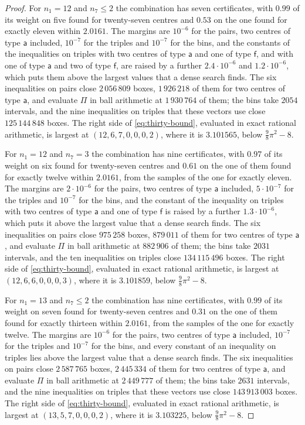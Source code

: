 \documentclass[11pt,reqno]{amsart}
\renewcommand{\_}{\origunderscore\allowbreak}
\numberwithin{equation}{section}
\theoremstyle{plain}
\theoremstyle{definition}
\theoremstyle{remark}
\begin{document}
\begin{proof}
For $n_1=12$ and $n_7\le2$ the combination has seven certificates, with
$0.99$ of its weight on five found for twenty-seven centres and $0.53$ on the
one found for exactly eleven within $2.0161$. The margins are $10^{-6}$ for
the pairs, two centres of type $\mathsf a$ included, $10^{-7}$ for the
triples and $10^{-7}$ for the bins, and the constants of the inequalities on
triples with two centres of type $\mathsf a$ and one of type $\mathsf f$,
and with one of type $\mathsf a$ and two of type $\mathsf f$, are raised
by a further $2.4\cdot10^{-6}$ and $1.2\cdot10^{-6}$, which puts them
above the largest values that a dense search finds. The six inequalities on pairs close $2\,056\,809$
boxes, $1\,926\,218$ of them for two centres of type $\mathsf a$, and evaluate $\Pi$
in ball arithmetic at $1\,930\,764$ of them; the bins take $2054$ intervals, and the
nine inequalities on triples that these vectors use close $125\,144\,848$ boxes. The
right side of \eqref{eq:thirty-bound}, evaluated in exact rational
arithmetic, is largest at $(12,6,7,0,0,0,2)$, where it is $3.101565$, below $\frac98\pi^2-8$.

For $n_1=12$ and $n_7=3$ the combination has nine certificates, with $0.97$
of its weight on six found for twenty-seven centres and $0.61$ on the one of
them found for exactly twelve within $2.0161$, from the samples of the one
for exactly eleven. The margins are $2\cdot10^{-6}$ for the pairs, two
centres of type $\mathsf a$ included, $5\cdot10^{-7}$ for the triples and
$10^{-7}$ for the bins,
and the constant of the inequality on triples with two centres of type
$\mathsf a$ and one of type $\mathsf f$ is raised by a further
$1.3\cdot10^{-6}$, which puts it above the largest value that a dense
search finds. The six inequalities on pairs close $975\,258$ boxes,
$879\,011$ of them for two centres of type $\mathsf a$, and evaluate $\Pi$ in
ball arithmetic at $882\,906$ of them; the bins take $2031$ intervals, and the ten
inequalities on triples close $134\,115\,496$ boxes. The right side of
\eqref{eq:thirty-bound}, evaluated in exact rational arithmetic, is largest
at $(12,6,6,0,0,0,3)$, where it is $3.101859$, below $\frac98\pi^2-8$.

For $n_1=13$ and $n_7\le2$ the combination has nine certificates, with
$0.99$ of its weight on seven found for twenty-seven centres and $0.31$ on
the one of them found for exactly thirteen within $2.0161$, from the samples
of the one for exactly twelve. The margins are $10^{-6}$ for the pairs, two
centres of type $\mathsf a$ included, $10^{-7}$ for the triples and
$10^{-7}$ for the bins, and every constant of an inequality on triples lies
above the largest value that a dense search finds. The six inequalities on
pairs close $2\,587\,765$ boxes, $2\,445\,334$ of them for two centres of type $\mathsf a$,
and evaluate $\Pi$ in ball arithmetic at $2\,449\,777$ of them; the bins take $2631$
intervals, and the nine inequalities on triples that these vectors use
close $143\,913\,003$ boxes. The right side of \eqref{eq:thirty-bound}, evaluated in
exact rational arithmetic, is largest at $(13,5,7,0,0,0,2)$, where it is $3.103225$, below
$\frac98\pi^2-8$.


\end{proof}
\end{document}
